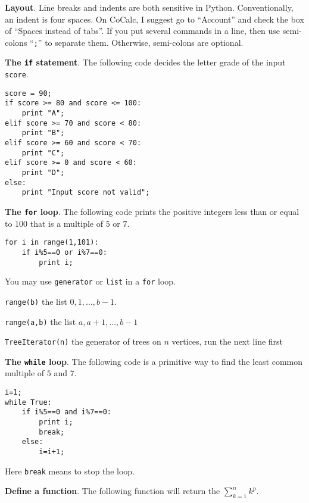 \documentclass{article}
\newcommand{\heading}[1]{\medskip\textbf{#1}.}
\newenvironment{lwdes}{\begin{description}[leftmargin=1.7cm,align=left,labelwidth=1.5cm]}{\end{description}}
\begin{document}
\begin{multicols}{2}
\heading{Layout}  Line breaks and indents are both sensitive in Python.  Conventionally, an indent is four spaces.  On CoCalc, I suggest go to ``Account'' and check the box of ``Spaces instead of tabs''.  If you put several commands in a line, then use semi-colons ``\texttt{;}'' to separate them.  Otherwise, semi-colons are optional.

\heading{The \texttt{if} statement}  The following code decides the letter grade of the input \texttt{score}.

\begin{verbatim}
score = 90;
if score >= 80 and score <= 100:
    print "A";
elif score >= 70 and score < 80:
    print "B";
elif score >= 60 and score < 70:
    print "C";
elif score >= 0 and score < 60:
    print "D";
else:
    print "Input score not valid";
\end{verbatim}

\heading{The \texttt{for} loop}  The following code prints the positive integers less than or equal to $100$ that is a multiple of $5$ or $7$.

\begin{verbatim}
for i in range(1,101):
    if i%5==0 or i%7==0:
        print i;
\end{verbatim}

You may use \texttt{generator} or \texttt{list} in a \texttt{for} loop.
\begin{lwdes}
\item[\texttt{range(b)}] the list $0,1,\ldots,b-1$.
\item[\texttt{range(a,b)}] the list $a,a+1,\ldots,b-1$
\item[\texttt{TreeIterator(n)}] the generator of trees on $n$ vertices, run the next line first\\
\end{lwdes}

\heading{The \texttt{while} loop}  The following code is a primitive way to find the least common multiple of $5$ and $7$.

\begin{verbatim}
i=1;
while True:
    if i%5==0 and i%7==0:
        print i;
        break;
    else:
        i=i+1;
\end{verbatim}

Here \texttt{break} means to stop the loop.

\heading{Define a function}  The following function will return  the $\sum_{k=1}^n k^p$.


\end{multicols}
\end{document}
